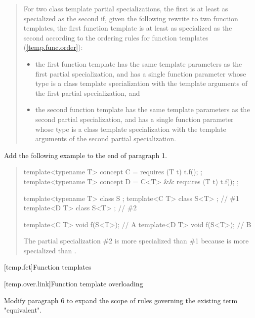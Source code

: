 \begin{quote}
\pnum
For two class template partial specializations, the first is 
at least as specialized as the second if, given the following 
rewrite to two function templates, the first function template 
is at least as specialized as the second according to the ordering 
rules for function templates 
(\ref{temp.func.order}):
% 
\begin{itemize}
\item the first function template has the same template 
parameters  
as the first partial specialization, and has a single function parameter 
whose type is a class template specialization with the template
arguments of the first partial specialization, and

\item the second function template has the same template 
parameters  
as the second partial specialization, and has a single function parameter 
whose type is a class template specialization with the template
arguments of the second partial specialization.
\end{itemize}
\end{quote}

Add the following example to the end of paragraph 1.

\begin{quote}
\begin{addedblock}
\enterexample
\begin{codeblock}
template<typename T> concept C = requires (T t) { t.f(); };
template<typename T> concept D = C<T> && requires (T t) { t.f(); };


template<typename T> class S { };
template<C T> class S<T> { }; // \#1
template<D T> class S<T> { }; // \#2

template<C T> void f(S<T>); // A
template<D T> void f(S<T>); // B
\end{codeblock}
The partial specialization \#2 is more specialized than 
\#1 because  is more specialized than .
\exitexample
\end{addedblock}
\end{quote}


[temp.fct]{Function templates}

[temp.over.link]{Function template overloading}

Modify paragraph 6 to expand the scope of rules governing the existing term
"equivalent".

